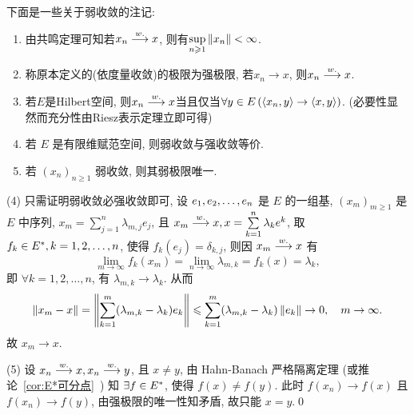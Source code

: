 	\begin{Remark}
		下面是一些关于弱收敛的注记:
		\begin{enumerate}[(1)]
			\item 由共鸣定理可知若$ x_n\overset{w.}{\longrightarrow} x $, 则有$ \sup\limits_{n\geqslant 1}\left\| x_n \right\|<\infty $.
			\item 称原本定义的(依度量收敛)的极限为强极限, 若$ x_n\to x $, 则$ x_n\overset{w.}{\longrightarrow} x $.
			\item 若$ E $是Hilbert空间, 则$ x_n\overset{w.}{\longrightarrow} x $当且仅当$ \forall y\in E\,(\left\langle x_n,y \right\rangle\to\left\langle x,y \right\rangle) $. (必要性显然而充分性由Riesz表示定理立即可得)
			\item 若 $ E $ 是有限维赋范空间, 则弱收敛与强收敛等价.
			\item 若 $ (x_{n})_{n\geqslant1} $ 弱收敛, 则其弱极限唯一.
		\end{enumerate}
	\end{Remark}

	\begin{Proof}
		(4) 只需证明弱收敛必强收敛即可, 设 $ e_{1}, e_{2}, \dots, e_{n} $ 是 $ E $ 的一组基, $ (x_{m})_{m\geqslant1} $ 是 $ E $ 中序列, $ x_{m}=\sum\limits_{j=1}^{n}\lambda_{m, j}e_{j} $, 且 $ x_{m}\overset{w.}{\longrightarrow} x, x=\sum\limits_{k=1}^{n}\lambda_{k}e^{k} $, 取 $ f_{k}\in E^{*}, k = 1, 2, \dots, n $, 使得 $ f_{k}(e_{j})=\delta_{k, j} $, 则因 $ x_{m}\overset{w.}{\longrightarrow} x $ 有
		\[
			\lim_{m\to\infty}f_{k}(x_{m})=\lim_{n\to\infty}\lambda_{m, k}=f_{k}(x)=\lambda_{k},
		\]
		即 $ \forall k=1, 2, \dots, n $, 有 $ \lambda_{m, k}\to \lambda_{k} $. 从而
		\[
			\left\| x_{m}-x \right\|=\left\| \sum_{k=1}^{m}(\lambda_{m, k}-\lambda_{k})e_{k} \right\|\leqslant\sum_{k=1}^{m}(\lambda_{m, k}-\lambda_{k})\left\| e_{k} \right\|\to 0, \quad m\to \infty.
		\]
		故 $ x_{m}\to x $.

		(5) 设 $ x_{n}\overset{w.}{\longrightarrow} x, x_{n}\overset{w.}{\longrightarrow} y $, 且 $ x\ne y $, 由 Hahn-Banach 严格隔离定理 (或推论~\ref{cor:E*可分点}~) 知 $ \exists f\in E^{*} $, 使得 $ f(x)\ne f(y) $. 此时 $ f(x_{n})\to f(x) $ 且 $ f(x_{n})\to f(y) $, 由强极限的唯一性知矛盾, 故只能 $ x=y $.\qed
	\end{Proof}

